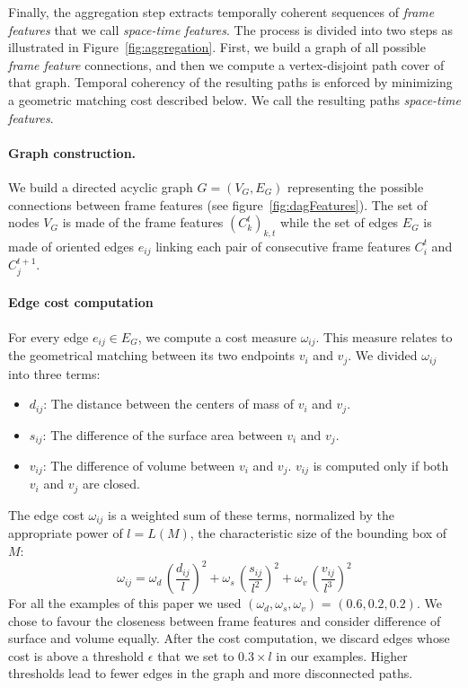 \documentclass[review]{acmsiggraph}
\begin{document}
Finally, the aggregation step extracts temporally coherent sequences of \emph{frame features} that we call \emph{space-time features}. 
The process is divided into two steps as illustrated in Figure~\ref{fig:aggregation}.
First, we build a graph of all possible \emph{frame feature} connections, and then we compute a vertex-disjoint path cover of that graph. Temporal coherency of the resulting paths is enforced by minimizing a geometric matching cost described below. We call the resulting paths \emph{space-time features}.

\paragraph*{Graph construction.}

We build a directed acyclic graph $G = (V_G, E_G) $ representing the possible connections between frame features (see figure~\ref{fig:dagFeatures}).
The set of nodes $V_{G}$ is made of the frame features $\left(C_{k}^{t}\right)_{k,t}$ while the set of edges $E_{G}$ is made of oriented edges $e_{ij}$ linking each pair of consecutive frame features $C_{i}^{t}$ and $C_{j}^{t+1}$.

\paragraph{Edge cost computation}

For every edge $e_{ij}\in E_{G}$, we compute a cost measure \(\omega_{ij}\). This measure relates to the geometrical matching between its two endpoints $v_{i}$ and $v_{j}$.
We divided \(\omega_{ij}\) into three terms:
\begin{itemize}
    \item $d_{ij}$: The distance between the centers of mass of $v_{i}$ and $v_{j}$.
    \item $s_{ij}$: The difference of the surface area between $v_{i}$ and $v_{j}$.
    \item $v_{ij}$: The difference of volume between $v_{i}$ and $v_{j}$. $v_{ij}$ is computed only if both $v_{i}$ and $v_{j}$ are closed.
\end{itemize}
The edge cost $\omega_{ij}$ is a weighted sum of these terms, normalized by the appropriate power of $l=L(M)$, the characteristic size of the bounding box of $M$:
\begin{equation}
\label{eq:costfunction}
\displaystyle \omega_{ij} = 
\omega_{d}\, \left(\frac{d_{ij}}{l  }\right)^2 +
\omega_{s}\, \left(\frac{s_{ij}}{l^2}\right)^2 + 
\omega_{v}\, \left(\frac{v_{ij}}{l^3}\right)^2
\end{equation}
For all the examples of this paper we used $\left( \omega_{d}, \omega_{s}, \omega_{v} \right)$ = $\left(0.6,0.2,0.2\right)$. We chose to favour the closeness between frame features and consider difference of surface and volume equally. After the cost computation, we discard edges whose cost is above a threshold $\epsilon$ that we set to $0.3 \times l$ in our examples. Higher thresholds lead to fewer edges in the graph and more disconnected paths.
\end{document}
